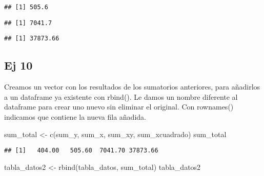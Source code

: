 \documentclass[
]{article}
\newenvironment{Shaded}{\begin{snugshade}}{\end{snugshade}}
\newcommand{\FunctionTok}[1]{\textcolor[rgb]{0.00,0.00,0.00}{#1}}
\newcommand{\NormalTok}[1]{#1}
\newcommand{\OtherTok}[1]{\textcolor[rgb]{0.56,0.35,0.01}{#1}}
\newcommand{\SpecialCharTok}[1]{\textcolor[rgb]{0.00,0.00,0.00}{#1}}
\begin{document}
\begin{verbatim}
## [1] 505.6
\end{verbatim}

\begin{Shaded}
\end{Shaded}

\begin{verbatim}
## [1] 7041.7
\end{verbatim}

\begin{Shaded}
\end{Shaded}

\begin{verbatim}
## [1] 37873.66
\end{verbatim}

\hypertarget{ej-10}{%
\subsection{Ej 10}\label{ej-10}}

Creamos un vector con los resultados de los sumatorios anteriores, para
añadirlos a un dataframe ya existente con rbind(). Le damos un nombre
diferente al dataframe para crear uno nuevo sin eliminar el original.
Con rownames() indicamos que contiene la nueva fila añadida.

\begin{Shaded}
\begin{Highlighting}[]
\NormalTok{sum\_total }\OtherTok{\textless{}{-}} \FunctionTok{c}\NormalTok{(sum\_y, sum\_x, sum\_xy, sum\_xcuadrado)}
\NormalTok{sum\_total}
\end{Highlighting}
\end{Shaded}

\begin{verbatim}
## [1]   404.00   505.60  7041.70 37873.66
\end{verbatim}

\begin{Shaded}
\begin{Highlighting}[]
\NormalTok{tabla\_datos2 }\OtherTok{\textless{}{-}} \FunctionTok{rbind}\NormalTok{(tabla\_datos, sum\_total)}
\NormalTok{tabla\_datos2}
\end{Highlighting}
\end{Shaded}
\end{document}
